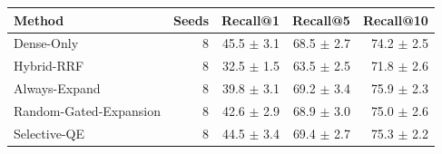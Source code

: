 \begin{tabular}{lrrrr}
\toprule
Method & Seeds & Recall@1 & Recall@5 & Recall@10 \\
\midrule
Dense-Only & 8 & 45.5 $\pm$ 3.1 & 68.5 $\pm$ 2.7 & 74.2 $\pm$ 2.5 \\
Hybrid-RRF & 8 & 32.5 $\pm$ 1.5 & 63.5 $\pm$ 2.5 & 71.8 $\pm$ 2.6 \\
Always-Expand & 8 & 39.8 $\pm$ 3.1 & 69.2 $\pm$ 3.4 & 75.9 $\pm$ 2.3 \\
Random-Gated-Expansion & 8 & 42.6 $\pm$ 2.9 & 68.9 $\pm$ 3.0 & 75.0 $\pm$ 2.6 \\
Selective-QE & 8 & 44.5 $\pm$ 3.4 & 69.4 $\pm$ 2.7 & 75.3 $\pm$ 2.2 \\
\bottomrule
\end{tabular}
